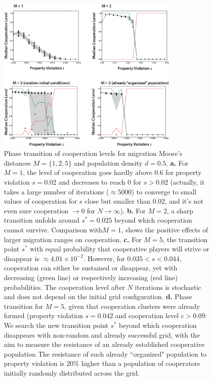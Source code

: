 \begin{figure}[h]
\begin{center}
\centerline{\includegraphics[width=9cm]{../figures2/phase_transitions.eps}}
\caption{Phase transition of cooperation levels for migration Moore's distances $M = \{1,2,5\}$ and population density $d=0.5$. {\bf a.} For $M=1$, the level of cooperation goes hardly above $0.6$ for property violation $s = 0.02$ and decreases to reach $0$ for $s > 0.02$ (actually, it takes a large number of iterations ($\approx 5000$) to converge to small values of cooperation for $s$ close but smaller than $0.02$, and it's not even sure cooperation $\rightarrow 0$ for $N \rightarrow \infty$). {\bf b.} For $M=2$, a sharp transition unfolds around $s^{*} = 0.025$ beyond which cooperation cannot survive. Comparison with$M=1$, shows the positive effects of larger migration ranges on cooperation. {\bf c.} For $M=5$, the transition point $s^{*}$ with equal probability that cooperative players will strive or disappear is $\approx 4.01\times10^{-2}$.  However, for $0.035 < s < 0.044$, cooperation can either be sustained or disappear, yet with decreasing (green line) or respectively increasing (red line) probabilities. The cooperation level after $N$ iterations is stochastic and does not depend on the initial grid configuration. {\bf d.}  Phase transition for $M=5$, given that cooperation clusters were already formed (property violation $s =0.042$ and cooperation level $c>0.09$: We search the new transition point $s^{*}$ beyond which cooperation disappears with non-random and already successful grid, with the aim to measure the resistance of an already established cooperative population The resistance of such already ``organized" population to property violation is $20\%$ higher than a population of cooperators initially randomly distributed across the grid.}
\label{fig:phase_transition}
\end{center}
\end{figure}



